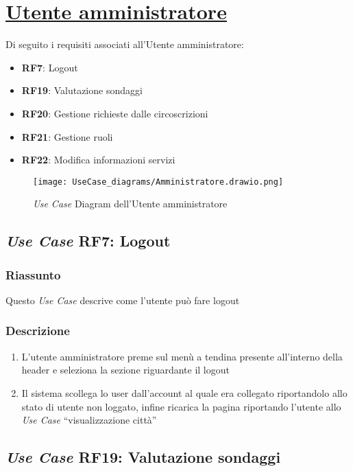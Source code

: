 \section{\underline{Utente amministratore}}
    Di seguito i requisiti associati all'Utente amministratore:
    \begin{itemize}
        \item \textbf{RF7}: Logout
        \item \textbf{RF19}: Valutazione sondaggi
        \item \textbf{RF20}: Gestione richieste dalle circoscrizioni
        \item \textbf{RF21}: Gestione ruoli
        \item \textbf{RF22}: Modifica informazioni servizi
    \end{itemize}
    \begin{figure}[H]
        \centering
        \texttt{[image: UseCase\_diagrams/Amministratore.drawio.png]}
        \caption{\textit{Use Case} Diagram dell'Utente amministratore}
    \end{figure}

    \subsection{\textit{Use Case} RF7: Logout}
        \subsubsection{Riassunto}
            Questo \textit{Use Case} descrive come l'utente può fare logout
        \subsubsection{Descrizione}
            \begin{enumerate}
                \item L'utente amministratore preme sul menù a tendina presente all'interno della header e seleziona la sezione riguardante il logout
                \item Il sistema scollega lo user dall'account al quale era collegato riportandolo allo stato di utente non loggato, infine 
                ricarica la pagina riportando l'utente allo \textit{Use Case} ``visualizzazione città''
            \end{enumerate}

    \subsection{\textit{Use Case} RF19: Valutazione sondaggi}

